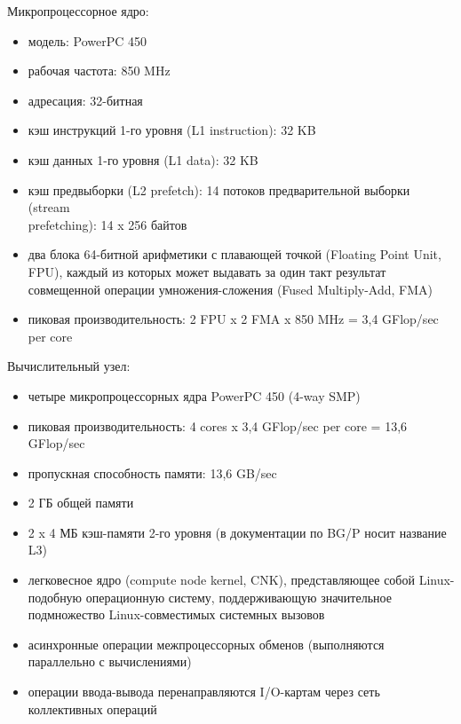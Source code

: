 \documentclass[12pt, a4paper]{article}
\begin{document}
            Микропроцессорное ядро:
            \begin{itemize}[leftmargin=1.5cm]
                \item модель: PowerPC 450
                \item рабочая частота: 850 MHz
                \item адресация: 32-битная
                \item кэш инструкций 1-го уровня (L1 instruction): 32 KB
                \item кэш данных 1-го уровня (L1 data): 32 KB
                \item кэш предвыборки (L2 prefetch): 14 потоков предварительной выборки (stream \\prefetching): 14 x 256 байтов
                \item два блока 64-битной арифметики с плавающей точкой (Floating Point Unit, FPU), каждый из которых может выдавать за один такт результат совмещенной операции умножения-сложения (Fused Multiply-Add, FMA)
                \item пиковая производительность: 2 FPU x 2 FMA x 850 MHz = 3,4 GFlop/sec per core
            \end{itemize}

            Вычислительный узел:
            \begin{itemize}[leftmargin=1.5cm]
                \item четыре микропроцессорных ядра PowerPC 450 (4-way SMP)
                \item пиковая производительность: 4 cores x 3,4 GFlop/sec per core = 13,6 GFlop/sec
                \item пропускная способность памяти: 13,6 GB/sec
                \item 2 ГБ общей памяти
                \item 2 x 4 МБ кэш-памяти 2-го уровня (в документации по BG/P носит название L3)
                \item легковесное ядро (compute node kernel, CNK), представляющее собой Linux-подобную операционную систему, поддерживающую значительное подмножество Linux-совместимых системных вызовов
                \item асинхронные операции межпроцессорных обменов (выполняются параллельно с вычислениями)
                \item операции ввода-вывода перенаправляются I/O-картам через сеть коллективных операций
            \end{itemize}
\end{document}
